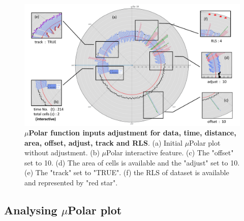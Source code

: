 \documentclass[conference]{IEEEtran}
\begin{document}
\begin{figure}
\centering
\includegraphics[width=\textwidth,height=10 cm]{Patterns/option.pdf}
\caption{ \textbf{ $\mu$Polar function inputs adjustment for data, time, distance, area, offset, adjust, track and RLS}. (a) Initial $\mu$Polar plot without adjustment. (b) $\mu$Polar interactive feature. (c) The "offset" set to 10. (d) The area of cells is available and the "adjust" set to 10. (e) The "track" set to "TRUE". (f) the RLS of dataset is available and represented by "red star".}
\label{fig:areaoff}
\end{figure}


\subsection{Analysing $\mu$Polar plot}
\end{document}
